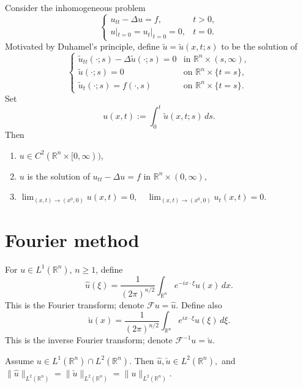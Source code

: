 \begin{theorem}
Consider the inhomogeneous problem
$$
\begin{cases}
u_{tt}-\Delta u=f, & t>0,\\
u|_{t=0}=u_t|_{t=0}=0, & t=0.
\end{cases}
$$
Motivated by Duhamel's principle, define $\widetilde{u}=\widetilde{u}(x,t;s)$ to be the solution of
$$
\begin{cases}
\widetilde{u}_{tt}(\cdot;s)-\Delta \widetilde{u}(\cdot;s)=0
& \text{in } \mathbb{R}^n\times (s,\infty),\\
\widetilde{u}(\cdot;s)=0
& \text{on } \mathbb{R}^n\times \{t=s\},\\
\widetilde{u}_t(\cdot;s)=f(\cdot,s)
& \text{on } \mathbb{R}^n\times \{t=s\}.
\end{cases}
$$
Set
$$
u(x,t):=\int_0^t \widetilde{u}(x,t;s)\,ds.
$$
Then
\begin{enumerate}
    \item $u\in C^2(\mathbb{R}^n\times [0,\infty))$,
    \item $u$ is the solution of
    $
    u_{tt}-\Delta u=f \text{ in } \mathbb{R}^n\times (0,\infty),
    $
    \item
    $
    \lim_{(x,t)\to (x^0,0)}u(x,t)=0,
    \quad
    \lim_{(x,t)\to (x^0,0)}u_t(x,t)=0.
    $
\end{enumerate}
\end{theorem}

\section{Fourier method}

\begin{definition}
For $u\in L^1(\mathbb{R}^n)$, $n\ge 1$, define
$$
\widehat{u}(\xi)
=
\frac{1}{(2\pi)^{n/2}}
\int_{\mathbb{R}^n}
e^{-ix\cdot \xi}u(x)\,dx.
$$
This is the Fourier transform; denote $\mathcal{F}u=\widehat{u}$.
Define also
$$
\check{u}(x)
=
\frac{1}{(2\pi)^{n/2}}
\int_{\mathbb{R}^n}
e^{ix\cdot \xi}u(\xi)\,d\xi.
$$
This is the inverse Fourier transform; denote $\mathcal{F}^{-1}u=\check{u}$.
\end{definition}

\begin{theorem}
Assume
$
u\in L^1(\mathbb{R}^n)\cap L^2(\mathbb{R}^n).
$
Then
$
\widehat{u},\check{u}\in L^2(\mathbb{R}^n),
$
and
$
\|\widehat{u}\|_{L^2(\mathbb{R}^n)}
=
\|\check{u}\|_{L^2(\mathbb{R}^n)}
=
\|u\|_{L^2(\mathbb{R}^n)}.
$
\end{theorem}

